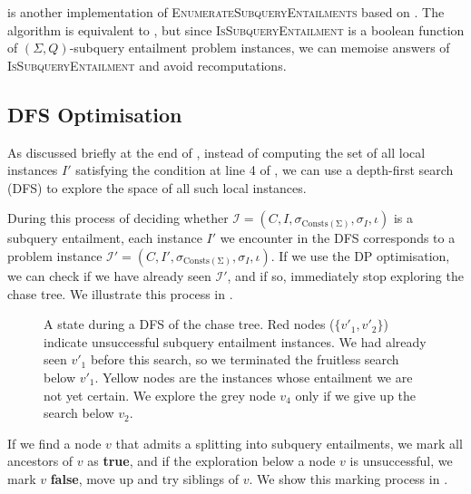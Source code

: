 \documentclass[12pt]{report}
\theoremstyle{plain}
\theoremstyle{definition}
\def\Consts{{\mathrm{Consts}}}
\begin{document}
 is another implementation of \nobreak\textsc{EnumerateSubqueryEntailments} based on . The algorithm is equivalent to , but since \textsc{IsSubqueryEntailment} is a boolean function of $(\Sigma, Q)$-subquery entailment problem instances, we can memoise answers of \textsc{IsSubqueryEntailment} and avoid recomputations.

\subsection{DFS Optimisation}
\label{subsection:dfs-optimisation}

As discussed briefly at the end of , instead of computing the set of all local instances $I'$ satisfying the condition at line 4 of , we can use a depth-first search (DFS) to explore the space of all such local instances.

During this process of deciding whether $\mathcal{I} = (C, I, \sigma_{\mathrm{\Consts(\Sigma)}}, \sigma_I, \iota)$ is a subquery entailment, each instance $I'$ we encounter in the DFS corresponds to a problem instance $\mathcal{I'} = (C, I', \sigma_{\mathrm{\Consts(\Sigma)}}, \sigma_I, \iota)$. If we use the DP optimisation, we can check if we have already seen $\mathcal{I'}$, and if so, immediately stop exploring the chase tree. We illustrate this process in .

\begin{figure}[t]
\centering

\caption{A state during a DFS of the chase tree. Red nodes ($\{v'_1, v'_2\}$) indicate unsuccessful subquery entailment instances. We had already seen $v'_1$ before this search, so we terminated the fruitless search below $v'_1$. Yellow nodes are the instances whose entailment we are not yet certain. We explore the grey node $v_4$ only if we give up the search below $v_2$.}
\label{figure:sctree-dfs-process}
\end{figure}

If we find a node $v$ that admits a splitting into subquery entailments, we mark all ancestors of $v$ as \textbf{true}, and if the exploration below a node $v$ is unsuccessful, we mark $v$ \textbf{false}, move up and try siblings of $v$. We show this marking process in .
\end{document}
